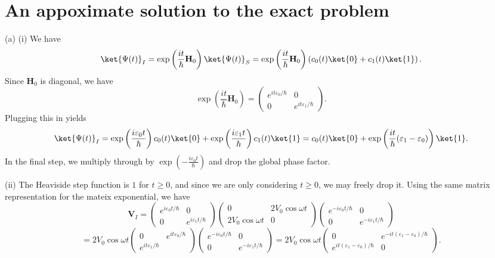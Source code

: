 \documentclass[11pt, letterpaper]{article}
\begin{document}
\section{An appoximate solution to the exact problem}

(a) (i) We have
\[
	\ket{\Psi (t)}_I=\exp \left( \frac{it}{\hbar} \mathbf{H} _0 \right) \ket{\Psi (t)}_S=\exp \left( \frac{it}{\hbar} \mathbf{H} _0 \right) \left( c_0(t)\ket{0}+c_1(t)\ket{1} \right) 
.\]
Since $\mathbf{H} _0$ is diagonal, we have
\[
	\exp \left( \frac{it}{\hbar} \mathbf{H} _0 \right) =\begin{pmatrix}
	e^{it\varepsilon _0/\hbar}  & 0 \\
	0 & e^{it\varepsilon _1/\hbar} 
	\end{pmatrix}
.\]
Plugging this in yields
\[
	\ket{\Psi (t)}_I=\exp \left( \frac{i\varepsilon _0t}{\hbar}  \right) c_0(t)\ket{0}+\exp \left( \frac{i\varepsilon _1t}{\hbar}  \right) c_1(t)\ket{1}=c_0(t)\ket{0}+\exp \left( \frac{it}{\hbar} (\varepsilon _1-\varepsilon _0) \right) \ket{1}
.\]
In the final step, we multiply through by $\exp \left( -\frac{i\varepsilon _0t}{\hbar}  \right) $ and drop the global phase factor. 

(ii) The Heaviside step function is $1$ for $t \geq 0$, and since we are only considering $t \geq 0$, we may freely drop it. Using the same matrix representation for the mateix exponential, we have
\[
	\mathbf{V} _I=\begin{pmatrix}
	e^{i\varepsilon _0t/\hbar}  & 0 \\
	0 & e^{i\varepsilon _1t/\hbar} 
	\end{pmatrix}\begin{pmatrix}
	0 & 2V_0 \cos \omega t \\
	2V_0\cos\omega t & 0
	\end{pmatrix}\begin{pmatrix}
	e^{-i\varepsilon _0t/\hbar}  & 0 \\
	0 & e^{-i\varepsilon _1t/\hbar} 
	\end{pmatrix}
\]
\[
	=2V_0 \cos \omega t \begin{pmatrix}
	0 & e^{it\varepsilon _0 /\hbar}  \\
	e^{it\varepsilon _1/\hbar}  & 
	\end{pmatrix}\begin{pmatrix}
	e^{-i\varepsilon _0t/\hbar}  & 0 \\
	0 & e^{-i\varepsilon _1t/\hbar} 
	\end{pmatrix}=2V_0 \cos \omega t\begin{pmatrix}
	0 & e^{-it(\varepsilon _1-\varepsilon _0) /\hbar}  \\
	e^{it(\varepsilon _1-\varepsilon _0) /\hbar}  & 0
	\end{pmatrix}
.\]
\end{document}
